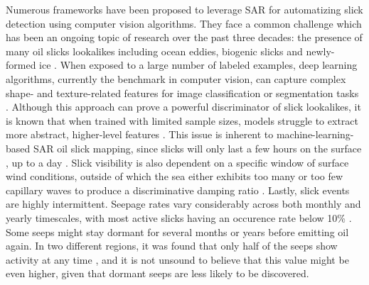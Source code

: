 \documentclass[journal]{IEEEtran}
\begin{document}
Numerous frameworks have been proposed to leverage SAR for automatizing slick detection using computer vision algorithms.
They face a common challenge which has been an ongoing topic of research over the past three decades: the presence of many oil slicks lookalikes including ocean eddies, biogenic slicks and newly-formed ice
\cite{johanssonCanMineralOil2020,hovlandSlickDetectionSAR1994,alpersOilsSurfactants2004,alpersOilSpillDetection2017,espedalSatelliteDetectionNatural1996}. When exposed to a large number of labeled examples, 
deep learning algorithms, currently the benchmark in computer vision, can capture complex shape- and texture-related features for image classification or segmentation tasks \cite{goodfellowDeepLearning2016}. 
Although this approach can prove a powerful discriminator of slick lookalikes, it is known that when trained with limited sample sizes, models struggle to extract more abstract,
higher-level features \cite{bengioDeepLearnersBenefit2011,bengioDeepLearningRepresentations2012}. This issue is inherent to machine-learning-based SAR oil slick mapping, since slicks will only last 
a few hours on the surface \cite{jatiaultMonitoringNaturalOil2017,daneshgaraslHindcastModelingOil2017,oreillyDistributionMagnitudeVariability2022}, up to a day
\cite{macdonaldNaturalUnnaturalOil2015,macdonaldNaturalOilSpills1998}. Slick visibility is also dependent on a specific window of surface wind conditions, outside of which the sea either exhibits too many or 
too few capillary waves to produce a discriminative damping ratio \cite{quigleyInvestigationDampingRatio2023,sausDetectionDelineationProduced2021,gadeImagingBiogenicAnthropogenic1998}. 
\IEEEpubidadjcol  
Lastly, slick events are highly intermittent. Seepage rates vary considerably across both monthly and yearly timescales, with most active slicks having an occurence rate below 10\% 
\cite{jatiaultNaturalOilSeep2024,oreillyDistributionMagnitudeVariability2022}. Some seeps might stay dormant for several months or years before emitting oil again. In two different regions, it was found that only
half of the seeps show activity at any time \cite{jatiaultMonitoringNaturalOil2017,garcia-pinedaRemotesensingEvaluationGeophysical2010}, and it is not unsound to believe that this value might be even higher, 
given that dormant seeps are less likely to be discovered.
\end{document}
